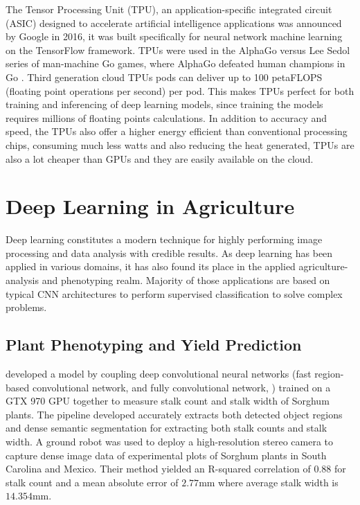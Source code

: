 \documentclass[12pt]{report}
\numberwithin{equation}{section}
\begin{document}
The Tensor Processing Unit (TPU), an application-specific integrated circuit (ASIC) designed to accelerate artificial intelligence applications was announced by Google in 2016, it was built specifically for neural network machine learning on the TensorFlow framework. TPUs were used in the AlphaGo versus Lee Sedol series of man-machine Go games, where AlphaGo defeated human champions in Go {\cite{Silver_2016}}. Third generation cloud TPUs pods can deliver up to 100 petaFLOPS (floating point operations per second) per pod. This makes TPUs perfect for both training and inferencing of deep learning models, since training the models requires millions of floating points calculations. In addition to accuracy and speed, the TPUs also offer a higher energy efficient than conventional processing chips, consuming much less watts and also reducing the heat generated, TPUs are also a lot cheaper than GPUs and they are easily available on the cloud.

\section{Deep Learning in Agriculture}
Deep learning constitutes a modern technique for highly performing image processing and data analysis with credible results.  As deep learning has been applied in various domains, it has also found its place in the applied agriculture-analysis and phenotyping realm. Majority of those applications are based on typical CNN architectures to perform supervised classification to solve complex problems.
\subsection{Plant Phenotyping and Yield Prediction}
{\cite{10.1007/978-3-319-67361-5_18}} developed a model by coupling deep convolutional neural networks (fast region-based convolutional network, {\cite{DBLP:journals/corr/Girshick15}} and fully convolutional network, {\cite{DBLP:journals/corr/LongSD14}}) trained on a GTX 970 GPU together to measure stalk count and stalk width of Sorghum plants. The pipeline developed accurately extracts both detected object regions and dense semantic segmentation for extracting both stalk counts and stalk width. A ground robot was used to deploy a high-resolution stereo camera to capture dense image data of experimental plots of Sorghum plants in South Carolina and Mexico. Their method yielded an R-squared correlation of $0.88$ for stalk count and a mean absolute error of $2.77$mm where average stalk width is $14.354$mm. 
\end{document}
